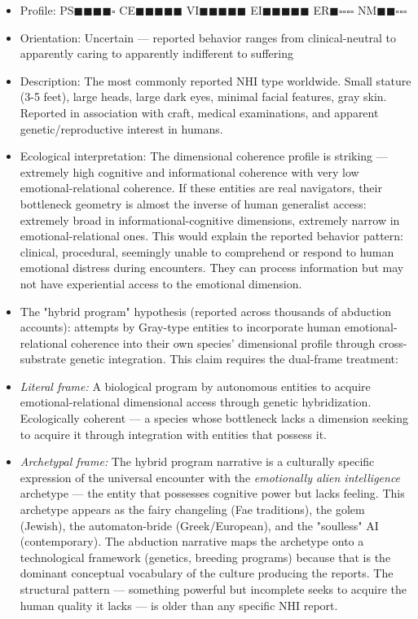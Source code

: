 \begin{itemize}[nosep,leftmargin=*]
  \item Profile: PS$\blacksquare$$\blacksquare$$\blacksquare$$\blacksquare$$\square$ CE$\blacksquare$$\blacksquare$$\blacksquare$$\blacksquare$$\blacksquare$ VI$\blacksquare$$\blacksquare$$\blacksquare$$\blacksquare$$\blacksquare$ EI$\blacksquare$$\blacksquare$$\blacksquare$$\blacksquare$$\blacksquare$ ER$\blacksquare$$\square$$\square$$\square$$\square$ NM$\blacksquare$$\blacksquare$$\square$$\square$$\square$
  \item Orientation: Uncertain — reported behavior ranges from clinical-neutral to apparently caring to apparently indifferent to suffering
  \item Description: The most commonly reported NHI type worldwide. Small stature (3-5 feet), large heads, large dark eyes, minimal facial features, gray skin. Reported in association with craft, medical examinations, and apparent genetic/\allowbreak reproductive interest in humans.
  \item Ecological interpretation: The dimensional coherence profile is striking — extremely high cognitive and informational coherence with very low emotional-relational coherence. If these entities are real navigators, their bottleneck geometry is almost the inverse of human generalist access: extremely broad in informational-cognitive dimensions, extremely narrow in emotional-relational ones. This would explain the reported behavior pattern: clinical, procedural, seemingly unable to comprehend or respond to human emotional distress during encounters. They can process information but may not have experiential access to the emotional dimension.
  \item The "hybrid program" hypothesis (reported across thousands of abduction accounts): attempts by Gray-type entities to incorporate human emotional-relational coherence into their own species' dimensional profile through cross-substrate genetic integration. This claim requires the dual-frame treatment:
  \item \textit{Literal frame:} A biological program by autonomous entities to acquire emotional-relational dimensional access through genetic hybridization. Ecologically coherent — a species whose bottleneck lacks a dimension seeking to acquire it through integration with entities that possess it.
  \item \textit{Archetypal frame:} The hybrid program narrative is a culturally specific expression of the universal encounter with the \textit{emotionally alien intelligence} archetype — the entity that possesses cognitive power but lacks feeling. This archetype appears as the fairy changeling (Fae traditions), the golem (Jewish), the automaton-bride (Greek/\allowbreak European), and the "soulless" AI (contemporary). The abduction narrative maps the archetype onto a technological framework (genetics, breeding programs) because that is the dominant conceptual vocabulary of the culture producing the reports. The structural pattern — something powerful but incomplete seeks to acquire the human quality it lacks — is older than any specific NHI report.

\end{itemize}
